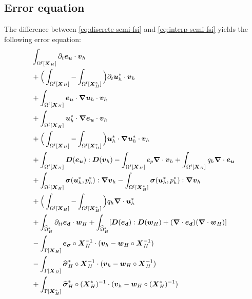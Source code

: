 \documentclass[11pt,reqno]{amsart}
\theoremstyle{definition}
\theoremstyle{plain}
\numberwithin{theorem}{section}
\numberwithin{proposition}{section}
\numberwithin{lemma}{section}
\numberwithin{equation}{section}
\newcommand{\bs}[1]{\boldsymbol{#1}}
\newcommand{\uu}[1]  {{\bs{#1}} }
\newcommand{\dep}{{{\bs{d}}}}
\newcommand{\grad}   { \uu{\nabla}    }
\newcommand{\bv}{{\bs v}}
\newcommand{\bu}{\uu{u}}
\newcommand{\bw}{{\bs w}}
\renewcommand{\(}{\bigl(}
\renewcommand{\)}{\bigr)}
\begin{document}
\subsection{Error equation}


The difference between \eqref{eq:discrete-semi-fsi} and \eqref{eq:interp-semi-fsi} yields the following error equation: 
\begin{subequations}\label{error-eq}
\begin{align}
& \int_{\Omega^{\rm f}[\bs X_H]} \partial_t {\bs e}_{\bs u} \cdot {\bs v}_h \label{error-eq-a}\\
& + \Big( \int_{\Omega^{\rm f}[\bs X_H]} - \int_{\Omega^{\rm f}[\bs X_H^*]} \Big) \partial_t {\bs u}_h^* \cdot {\bs v}_h \label{error-eq-b}\\
& + \int_{\Omega^{\rm f}[\bs X_H]} {\bs e}_{\bs u} \cdot \grad \bu_h \cdot {\bs v}_h \label{error-eq-c}\\
& + \int_{\Omega^{\rm f}[\bs X_H]} {\bs u}_h^* \cdot \grad {\bs e}_{\bs u}  \cdot {\bs v}_h \label{error-eq-d}\\
& + \Big( \int_{\Omega^{\rm f}[\bs X_H]} - \int_{\Omega^{\rm f}[\bs X_H^*]} \Big) {\bs u}_h^* \cdot \grad {\bs u}_h^* \cdot {\bs v}_h \label{error-eq-e}\\
&
+ \int_{\Omega^{\rm f}[\bs X_H]} \bs D({\bs e}_{\bs u}): \bs D(\bv_h) - \int_{\Omega^{\rm f}[\bs X_H]}  e_p \grad\cdot \bv_h
+ \int_{\Omega^{\rm f}[\bs X_H]}  q_h \grad\cdot {\bs e}_{\bs u}  \label{error-eq-f}\\ 
& + \int_{\Omega^{\rm f}[\bs X_H]} {\bs\sigma}(\bu_h^*,p_h^*): \grad \bv_h 
- \int_{\Omega^{\rm f}[\bs X_H^*]} {\bs\sigma}(\bu_h^*,p_h^*): \grad \bv_h 
\label{error-eq-g} \\
& + \Big( \int_{\Omega^{\rm f}[\bs X_H]} - \int_{\Omega^{\rm f}[\bs X_H^*]} \Big) q_h \grad\cdot \bu_h^* \label{error-eq-h}\\
& +  \int_{\widehat{\Omega}^{\rm s}_H} \partial_{tt} {\bs e}_{\dep} \cdot \bw_H 
+ \int_{\widehat{\Omega}^{\rm s}_H} [{\bs D}({\bs e}_\dep) : {\bs D}({\bs w}_H) + (\grad\cdot {\bs e}_\dep)(\grad\cdot{\bs w}_H) ] \label{error-eq-i}\\ 
& - \int_{\Gamma[\bs X_H]} {\bs e}_{{\bs \sigma} }\circ{\bs X}_H^{-1} \cdot ( \bv_h - \bw_H \circ{\bs X}_H^{-1}) \label{error-eq-j}\\
& - \int_{\Gamma[\bs X_H]} {\widehat{\bs \sigma} }_H^*\circ{\bs X}_H^{-1} \cdot ( \bv_h - \bw_H \circ{\bs X}_H^{-1}) 
\label{error-eq-k}\\
& + \int_{\Gamma[\bs X_H^*]} {\widehat{\bs \sigma} }_H^* \circ({\bs X}_H^*)^{-1}\cdot ( \bv_h - \bw_H\circ({\bs X}_H^*)^{-1}) 

\end{align}
\end{subequations}
\end{document}
